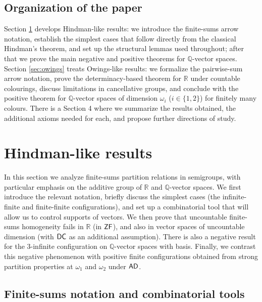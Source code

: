 \documentclass{amsart}
\theoremstyle{definition}
\newcommand{\zf}{\mathnormal{\mathsf{ZF}}}
\newcommand{\dc}{\mathnormal{\mathsf{DC}}}
\newcommand{\ad}{\mathnormal{\mathsf{AD}}}
\theoremstyle{remark}
\numberwithin{equation}{section}
\begin{document}
\subsection*{Organization of the paper}\label{sec:paper-organization}
Section \ref{sec:hindman} develops Hindman-like results: we introduce the finite-sums arrow notation, establish the simplest cases that follow directly from the classical Hindman's theorem, and set up the structural lemmas used throughout; after that we prove the main negative and positive theorems for $\mathbb{Q}$-vector spaces. Section \ref{sec:owings} treats Owings-like results: we formalize the pairwise-sum arrow notation, prove the determinacy-based theorem for $\mathbb{R}$ under countable colourings, discuss limitations in cancellative groups, and conclude with the positive theorem for $\mathbb{Q}$-vector spaces of dimension $\omega_i$ ($i\in\{1,2\}$) for finitely many colours. There is a Section 4 where we summarize the results obtained, the additional axioms needed for each, and propose further directions of study.



\section{Hindman-like results}\label{sec:hindman}

In this section we analyze finite-sums partition relations in semigroups, with particular emphasis on the additive group of $\mathbb R$ and $\mathbb{Q}$-vector spaces. 
We first introduce the relevant notation, briefly discuss the simplest cases (the infinite-finite and finite-finite configurations), and set up a combinatorial tool that will allow us to control supports of vectors. 
We then prove that uncountable finite-sums homogeneity fails in $\mathbb R$ (in $\zf$), and also in vector spaces of uncountable dimension (with $\dc$ as an additional assumption). There is also a negative result for the $3$-infinite configuration on $\mathbb Q$-vector spaces with basis. Finally, we contrast this negative phenomenon with positive finite configurations obtained from strong partition properties at $\omega_1$ and $\omega_2$ under $\ad$.


\subsection{Finite-sums notation and combinatorial tools}\label{subsec:hindman-tools}
\end{document}
